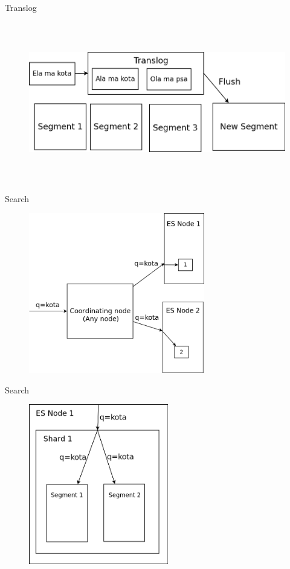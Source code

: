 \documentclass{beamer}
\begin{document}
\begin{frame}{Translog}
	\begin{figure}
		\includegraphics[width=\textwidth,height=7cm,keepaspectratio=true]{translog}
	\end{figure}
\end{frame}
\begin{frame}{Search}
	\begin{figure}
		\includegraphics[width=\textwidth,height=7cm,keepaspectratio=true]{search1}
	\end{figure}
\end{frame}
\begin{frame}{Search}
	\begin{figure}
		\includegraphics[width=\textwidth,height=7cm,keepaspectratio=true]{search5}
	\end{figure}
\end{frame}
\end{document}
